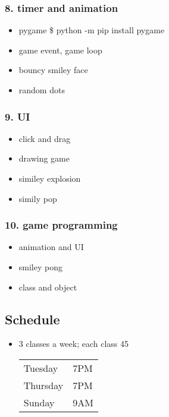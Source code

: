 \documentclass[11pt]{article}
\begin{document}
\subsubsection{8. timer and animation}
\label{sec:orge6b721b}
\begin{itemize}
\item pygame
\$ python -m pip install pygame
\item game event, game loop
\item bouncy smiley face
\item random dots
\end{itemize}

\subsubsection{9. UI}
\label{sec:org8ec0161}
\begin{itemize}
\item click and drag
\item drawing game
\item similey explosion
\item simily pop
\end{itemize}

\subsubsection{10. game programming}
\label{sec:org22bca1f}
\begin{itemize}
\item animation and UI
\item smiley pong
\item class and object
\end{itemize}

\subsection{Schedule}
\label{sec:org057c877}
\begin{itemize}
\item 3 classes a week; each class 45
\begin{center}
\begin{tabular}{ll}
\hline
Tuesday & 7PM\\
Thursday & 7PM\\
Sunday & 9AM\\
\hline
\end{tabular}
\end{center}
\end{itemize}
\end{document}
